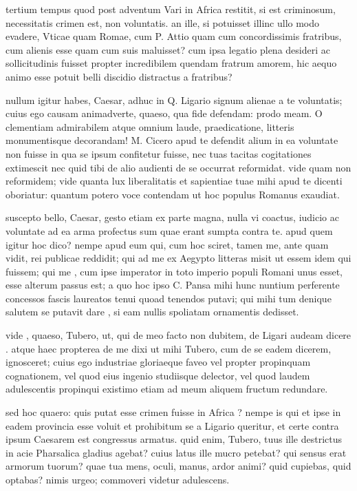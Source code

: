  tertium tempus quod post adventum Vari in Africa restitit, si est criminosum, necessitatis crimen est, non voluntatis. an ille, si potuisset illinc ullo modo evadere, Vticae quam Romae, cum P. Attio quam cum concordissimis fratribus, cum alienis esse quam cum suis maluisset? cum ipsa legatio plena desideri ac sollicitudinis fuisset propter incredibilem quendam fratrum amorem, hic aequo animo esse potuit belli discidio distractus a fratribus?

 nullum igitur habes, Caesar, adhuc in Q. Ligario signum alienae a te voluntatis; cuius ego causam animadverte, quaeso, qua fide defendam: prodo meam. O clementiam admirabilem atque omnium laude, praedicatione, litteris monumentisque decorandam! M. Cicero apud te defendit alium in ea voluntate non fuisse in qua se ipsum confitetur fuisse, nec tuas tacitas cogitationes extimescit nec quid tibi de alio audienti de se occurrat reformidat. vide quam non reformidem; vide quanta lux liberalitatis et sapientiae tuae mihi apud te dicenti oboriatur: quantum potero voce contendam ut hoc populus Romanus exaudiat.

 suscepto bello, Caesar, gesto etiam ex parte magna, nulla vi coactus, iudicio ac voluntate ad ea arma profectus sum quae erant sumpta contra te. apud quem igitur hoc dico? nempe apud eum qui, cum hoc sciret, tamen me, ante quam vidit, rei publicae reddidit; qui ad me ex Aegypto litteras misit ut essem idem qui fuissem; qui me , cum ipse imperator in toto imperio populi Romani unus esset, esse alterum passus est; a quo hoc ipso C. Pansa mihi hunc nuntium perferente concessos fascis laureatos tenui quoad tenendos putavi; qui mihi tum denique salutem se putavit dare , si eam nullis spoliatam ornamentis dedisset.

 vide , quaeso, Tubero, ut, qui de meo facto non dubitem, de Ligari audeam dicere . atque haec propterea de me dixi ut mihi Tubero, cum de se eadem dicerem, ignosceret; cuius ego industriae gloriaeque faveo vel propter propinquam cognationem, vel quod eius ingenio studiisque delector, vel quod laudem adulescentis propinqui existimo etiam ad meum aliquem fructum redundare.

 sed hoc quaero: quis putat esse crimen fuisse in Africa ? nempe is qui et ipse in eadem provincia esse voluit et prohibitum se a Ligario queritur, et certe contra ipsum Caesarem est congressus armatus. quid enim, Tubero, tuus ille destrictus in acie Pharsalica gladius agebat? cuius latus ille mucro petebat? qui sensus erat armorum tuorum? quae tua mens, oculi, manus, ardor animi? quid cupiebas, quid optabas? nimis urgeo; commoveri videtur adulescens.

